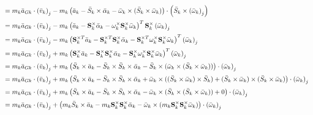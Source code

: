 \documentclass[a4paper,10pt]{article}
\newcommand\scalemath[2]{\scalebox{#1}{\mbox{\ensuremath{\displaystyle #2}}}}
\begin{document}
\begin{align}
 &\scalemath{0.775}{=  m_k \bar{a}_{Gk} \cdot \left(\bar{v}_k\right)_j - m_k \left( \bar{a}_k-\bar{S}_k \times \bar{\alpha}_k - \bar{\omega}_k \times (\bar{S}_k \times \bar{\omega}_k) \right) \cdot \left(\bar{S}_k \times \left(\bar{\omega}_k\right)_j\right)} \nonumber \\
 &\scalemath{0.775}{=  m_k \bar{a}_{Gk} \cdot \left(\bar{v}_k\right)_j - m_k \left( \bar{a}_k-\mathbf{S}^{\times}_k \bar{\alpha}_k - \mathbf{\omega}^{\times}_k \mathbf{S}^{\times}_k \bar{\omega}_k \right)^T  \mathbf{S}^{\times}_k \left(\bar{\omega}_k\right)_j} \nonumber \\
 &\scalemath{0.775}{=  m_k \bar{a}_{Gk} \cdot \left(\bar{v}_k\right)_j - m_k \left( \mathbf{S}^{\times T}_k \bar{a}_k -  \mathbf{S}^{\times T}_k \mathbf{S}^{\times}_k \bar{\alpha}_k - \mathbf{S}^{\times T}_k \mathbf{\omega}^{\times}_k \mathbf{S}^{\times}_k \bar{\omega}_k \right)^T  \left(\bar{\omega}_k\right)_j} \nonumber \\
 &\scalemath{0.775}{=  m_k \bar{a}_{Gk} \cdot \left(\bar{v}_k\right)_j + m_k \left( \mathbf{S}^{\times}_k \bar{a}_k -  \mathbf{S}^{\times}_k \mathbf{S}^{\times}_k \bar{\alpha}_k - \mathbf{S}^{\times}_k \mathbf{\omega}^{\times}_k \mathbf{S}^{\times}_k \bar{\omega}_k \right)^T  \left(\bar{\omega}_k\right)_j} \nonumber \\
 &\scalemath{0.775}{=  m_k \bar{a}_{Gk} \cdot \left(\bar{v}_k\right)_j + m_k \left( \bar{S}_k \times \bar{a}_k -  \bar{S}_k \times \bar{S}_k \times \bar{\alpha}_k - \bar{S}_k \times ( \bar{\omega}_k \times ( \bar{S}_k \times \bar{\omega}_k ) ) \right) \cdot  \left(\bar{\omega}_k\right)_j} \nonumber \\
 &\scalemath{0.775}{=  m_k \bar{a}_{Gk} \cdot \left(\bar{v}_k\right)_j + m_k \left( \bar{S}_k \times \bar{a}_k -  \bar{S}_k \times \bar{S}_k \times \bar{\alpha}_k + \bar{\omega}_k \times ( ( \bar{S}_k \times \bar{\omega}_k ) \times  \bar{S}_k ) + ( \bar{S}_k \times \bar{\omega}_k ) \times ( \bar{S}_k \times \bar{\omega}_k )  \right) \cdot  \left(\bar{\omega}_k\right)_j} \nonumber \\
 &\scalemath{0.775}{=  m_k \bar{a}_{Gk} \cdot \left(\bar{v}_k\right)_j + m_k \left( \bar{S}_k \times \bar{a}_k -  \bar{S}_k \times \bar{S}_k \times \bar{\alpha}_k - \bar{\omega}_k \times ( \bar{S}_k \times ( \bar{S}_k \times \bar{\omega}_k ) ) + 0  \right) \cdot  \left(\bar{\omega}_k\right)_j} \nonumber \\
 &\scalemath{0.775}{=  m_k \bar{a}_{Gk} \cdot \left(\bar{v}_k\right)_j + \left( m_k \bar{S}_k \times \bar{a}_k -  m_k \mathbf{S}^{\times}_k \mathbf{S}^{\times}_k \bar{\alpha}_k - \bar{\omega}_k \times (m_k \mathbf{S}^{\times}_k \mathbf{S}^{\times}_k \bar{\omega}_k) \right) \cdot  \left(\bar{\omega}_k\right)_j} \\

\end{align}
\end{document}
